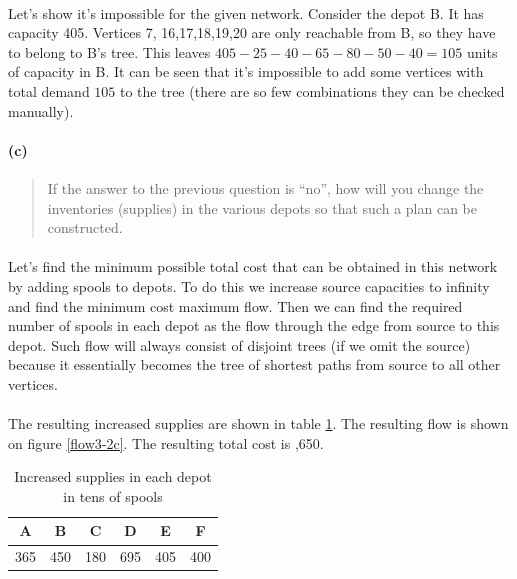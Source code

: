 \paragraph{}
Let's show it's impossible for the given network. Consider the depot B. It has capacity 405. Vertices 7, 16,17,18,19,20 are only reachable from B, so they have to belong to B's tree. This leaves $405-25-40-65-80-50-40=105$ units of capacity in B. It can be seen that it's impossible to add some vertices with total demand $105$ to the tree (there are so few combinations they can be checked manually).

\paragraph{(c)}
\begin{quote}
If the answer to the previous question is ``no'', how will you change the inventories (supplies) in the various depots so that such a plan can be constructed.
\end{quote}

\paragraph{}
Let's find the minimum possible total cost that can be obtained in this network by adding spools to depots. To do this we increase source capacities to infinity and find the minimum cost maximum flow. Then we can find the required number of spools in each depot as the flow through the edge from source to this depot. Such flow will always consist of disjoint trees (if we omit the source) because it essentially becomes the tree of shortest paths from source to all other vertices.

\paragraph{}
The resulting increased supplies are shown in table \ref{increased-supplies}. The resulting flow is shown on figure \ref{flow3-2c}. The resulting total cost is ,650.

\begin{table}[H]
\centering
\begin{tabular}{|c|c|c|c|c|c|}
\hline
A & B & C & D & E & F \\ \hline
365 & 450 & 180 & 695 & 405 & 400  \\ \hline
\end{tabular}
\caption{Increased supplies in each depot in tens of spools}
\label{increased-supplies}
\end{table}

